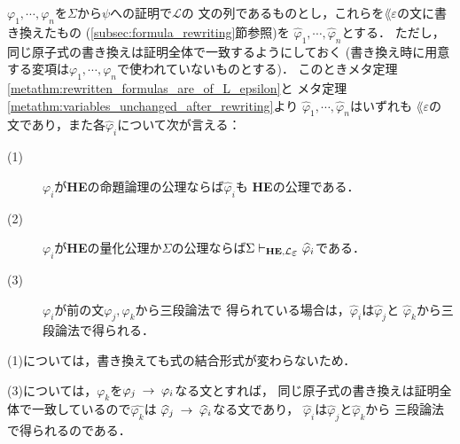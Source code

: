 	\begin{metaprf}
		$\varphi_{1},\cdots,\varphi_{n}$を$\Sigma$から$\psi$への証明で$\mathcal{L}$の
		文の列であるものとし，これらを$\lang{\varepsilon}$の文に書き換えたもの
		(\ref{subsec:formula_rewriting}節参照)を
		$\widehat{\varphi}_{1},\cdots,\widehat{\varphi}_{n}$とする．
		ただし，同じ原子式の書き換えは証明全体で一致するようにしておく
		(書き換え時に用意する変項は$\varphi_{1},\cdots,\varphi_{n}$で使われていないものとする)．
		このときメタ定理\ref{metathm:rewritten_formulas_are_of_L_epsilon}と
		メタ定理\ref{metathm:variables_unchanged_after_rewriting}より
		$\widehat{\varphi}_{1},\cdots,\widehat{\varphi}_{n}$はいずれも
		$\lang{\varepsilon}$の文であり，また各$\widehat{\varphi}_{i}$について次が言える：
		\begin{description}
			\item[(1)] $\varphi_{i}$が{\bf HE}の命題論理の公理ならば$\widehat{\varphi}_{i}$も
				{\bf HE}の公理である．
				
			\item[(2)] $\varphi_{i}$が{\bf HE}の量化公理か$\Sigma$の公理ならば$\Sigma 
				\provable{\mbox{{\bf HE}},\lang{\varepsilon}} \widehat{\varphi}_{i}$である．
				
			\item[(3)] $\varphi_{i}$が前の文$\varphi_{j},\varphi_{k}$から三段論法で
				得られている場合は，$\widehat{\varphi}_{i}$は$\widehat{\varphi}_{j}$と
				$\widehat{\varphi}_{k}$から三段論法で得られる．
		\end{description}
		
		(1)については，書き換えても式の結合形式が変わらないため．
		
		(3)については，$\varphi_{k}$を$\varphi_{j} \hspace{0.25em}\rightarrow\hspace{0.25em} \varphi_{i}$なる文とすれば，
		同じ原子式の書き換えは証明全体で一致しているので$\widehat{\varphi_{k}}$は
		$\widehat{\varphi}_{j} \hspace{0.25em}\rightarrow\hspace{0.25em} \widehat{\varphi}_{i}$なる文であり，
		$\widehat{\varphi}_{i}$は$\widehat{\varphi}_{j}$と$\widehat{\varphi}_{k}$から
		三段論法で得られるのである．
		

\end{metaprf}
